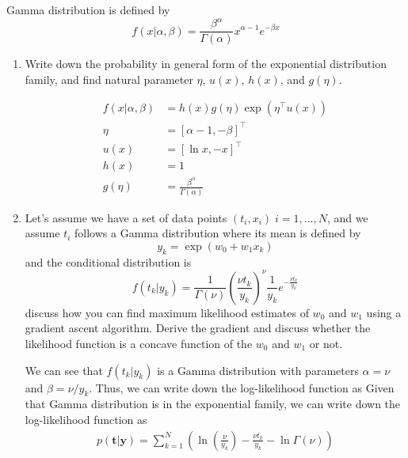 \documentclass{article}
\begin{document}
Gamma distribution is defined by  
\begin{equation}
    f(x|\alpha, \beta) = \frac{\beta^\alpha}{\Gamma(\alpha)} x^{\alpha-1} e^{-\beta x}
\end{equation}
\begin{enumerate}
    \item Write down the probability in general form of the exponential distribution family, and find 
    natural parameter $\eta$, $u(x)$, $h(x)$, and $g(\eta)$.
    \color{blue}
    \begin{sol}
        \begin{align*}
            f(x|\alpha,\beta) &= h(x)g(\eta)\exp(\eta^\top u(x))\\
            \eta &= \left[\alpha - 1, -\beta\right]^\top\\
            u(x) &= \left[\ln x, -x\right]^\top\\
            h(x) &= 1\\
            g(\eta) &= \frac{\beta^\alpha}{\Gamma(\alpha)}
        \end{align*}
    \end{sol}
    \color{black}
    \item Let’s assume we have a set of data points $(t_i,x_i)\; i = 1, \dots, N$, and we assume $t_i$ follows a Gamma 
    distribution where its mean is defined by
    \begin{equation}
        y_k = \exp\left(w_0 + w_1 x_k\right)
    \end{equation}
    and the conditional distribution is 
    \begin{equation}
        f(t_k|y_k) =  \frac{1}{\Gamma(\nu)}\left(\frac{\nu t_k}{y_k}\right)^{\nu} \frac{1}{y_k} e^{-\frac{\nu t_k}{y_k}}
    \end{equation}
    discuss how you can find maximum likelihood estimates of $w_0$ and $w_1$ using a gradient ascent algorithm. Derive the gradient and discuss whether the likelihood function is a concave function of the $w_0$ and $w_1$ or not.
    \color{blue}
    \begin{sol}
        We can see that $f(t_k|y_k)$ is a Gamma distribution with parameters $\alpha = \nu$ and $\beta = \nu/y_k$. Thus, we can write down the log-likelihood function as
        Given that Gamma distribution is in the exponential family, we can write down the log-likelihood function as
        \begin{align*}
            p(\mathbf{t}|\mathbf{y}) = \sum_{k=1}^{N} \left(\ln\left(\frac{\nu}{y_k}\right) - \frac{\nu t_k}{y_k} - \ln \Gamma(\nu)\right)

\end{align*}
\end{sol}
\end{enumerate}
\end{document}
